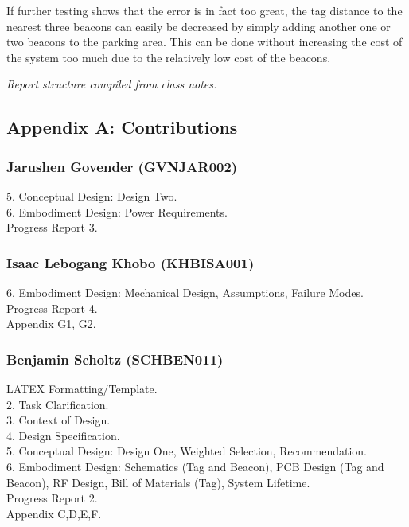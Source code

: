If further testing shows that the error is in fact too great, the tag distance to the nearest three beacons
can easily be decreased by simply adding another one or two beacons to the parking area. This can be
done without increasing the cost of the system too much due to the relatively low cost of the beacons.

\textit{Report structure compiled from class notes.}\cite{handout}\cite{notes}



\newpage
\vspace*{\fill}
\begin{center}
\subsection*{Appendix A: Contributions}
\end{center}
\vspace*{\fill}

\newpage
\subsubsection*{Jarushen Govender (GVNJAR002)}
5. Conceptual Design: Design Two.\\
6. Embodiment Design: Power Requirements.\\
Progress Report 3.
\subsubsection*{Isaac Lebogang Khobo (KHBISA001)}
6. Embodiment Design: Mechanical Design, Assumptions, Failure Modes.\\
Progress Report 4. \\
Appendix G1, G2.
\subsubsection*{Benjamin Scholtz (SCHBEN011)}
LATEX Formatting/Template. \\
2. Task Clarification. \\
3. Context of Design. \\
4. Design Specification. \\
5. Conceptual Design: Design One, Weighted Selection, Recommendation. \\
6. Embodiment Design: Schematics (Tag and Beacon), PCB Design (Tag and Beacon), RF Design, Bill of Materials (Tag), System Lifetime. \\
Progress Report 2. \\
Appendix C,D,E,F.
